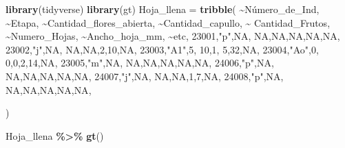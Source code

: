 \documentclass[
]{book}
\newenvironment{Shaded}{\begin{snugshade}}{\end{snugshade}}
\newcommand{\ConstantTok}[1]{\textcolor[rgb]{0.56,0.35,0.01}{#1}}
\newcommand{\DecValTok}[1]{\textcolor[rgb]{0.00,0.00,0.81}{#1}}
\newcommand{\FunctionTok}[1]{\textcolor[rgb]{0.13,0.29,0.53}{\textbf{#1}}}
\newcommand{\NormalTok}[1]{#1}
\newcommand{\OtherTok}[1]{\textcolor[rgb]{0.56,0.35,0.01}{#1}}
\newcommand{\SpecialCharTok}[1]{\textcolor[rgb]{0.81,0.36,0.00}{\textbf{#1}}}
\newcommand{\StringTok}[1]{\textcolor[rgb]{0.31,0.60,0.02}{#1}}
\theoremstyle{definition}
\theoremstyle{definition}
\theoremstyle{definition}
\theoremstyle{definition}
\theoremstyle{remark}
\begin{document}
\begin{Shaded}
\begin{Highlighting}[]
\FunctionTok{library}\NormalTok{(tidyverse)}
\FunctionTok{library}\NormalTok{(gt)}
\NormalTok{Hoja\_llena }\OtherTok{=} \FunctionTok{tribble}\NormalTok{(}
  \SpecialCharTok{\textasciitilde{}}\NormalTok{Número\_de\_Ind, }\SpecialCharTok{\textasciitilde{}}\NormalTok{Etapa, }\SpecialCharTok{\textasciitilde{}}\NormalTok{Cantidad\_flores\_abierta, }\SpecialCharTok{\textasciitilde{}}\NormalTok{Cantidad\_capullo, }\SpecialCharTok{\textasciitilde{}}\NormalTok{ Cantidad\_Frutos, }\SpecialCharTok{\textasciitilde{}}\NormalTok{Numero\_Hojas, }\SpecialCharTok{\textasciitilde{}}\NormalTok{Ancho\_hoja\_mm, }\SpecialCharTok{\textasciitilde{}}\NormalTok{etc,}
  \DecValTok{23001}\NormalTok{,}\StringTok{"p"}\NormalTok{,}\ConstantTok{NA}\NormalTok{, }\ConstantTok{NA}\NormalTok{,}\ConstantTok{NA}\NormalTok{,}\ConstantTok{NA}\NormalTok{,}\ConstantTok{NA}\NormalTok{,}\ConstantTok{NA}\NormalTok{,}
  \DecValTok{23002}\NormalTok{,}\StringTok{"j"}\NormalTok{,}\ConstantTok{NA}\NormalTok{, }\ConstantTok{NA}\NormalTok{,}\ConstantTok{NA}\NormalTok{,}\DecValTok{2}\NormalTok{,}\DecValTok{10}\NormalTok{,}\ConstantTok{NA}\NormalTok{,}
  \DecValTok{23003}\NormalTok{,}\StringTok{"A1"}\NormalTok{,}\DecValTok{5}\NormalTok{, }\DecValTok{10}\NormalTok{,}\DecValTok{1}\NormalTok{, }\DecValTok{5}\NormalTok{,}\DecValTok{32}\NormalTok{,}\ConstantTok{NA}\NormalTok{,}
  \DecValTok{23004}\NormalTok{,}\StringTok{"Ao"}\NormalTok{,}\DecValTok{0}\NormalTok{, }\DecValTok{0}\NormalTok{,}\DecValTok{0}\NormalTok{,}\DecValTok{2}\NormalTok{,}\DecValTok{14}\NormalTok{,}\ConstantTok{NA}\NormalTok{,}
  \DecValTok{23005}\NormalTok{,}\StringTok{"m"}\NormalTok{,}\ConstantTok{NA}\NormalTok{, }\ConstantTok{NA}\NormalTok{,}\ConstantTok{NA}\NormalTok{,}\ConstantTok{NA}\NormalTok{,}\ConstantTok{NA}\NormalTok{,}\ConstantTok{NA}\NormalTok{,}
  \DecValTok{24006}\NormalTok{,}\StringTok{"p"}\NormalTok{,}\ConstantTok{NA}\NormalTok{, }\ConstantTok{NA}\NormalTok{,}\ConstantTok{NA}\NormalTok{,}\ConstantTok{NA}\NormalTok{,}\ConstantTok{NA}\NormalTok{,}\ConstantTok{NA}\NormalTok{,}
  \DecValTok{24007}\NormalTok{,}\StringTok{"j"}\NormalTok{,}\ConstantTok{NA}\NormalTok{, }\ConstantTok{NA}\NormalTok{,}\ConstantTok{NA}\NormalTok{,}\DecValTok{1}\NormalTok{,}\DecValTok{7}\NormalTok{,}\ConstantTok{NA}\NormalTok{,}
  \DecValTok{24008}\NormalTok{,}\StringTok{"p"}\NormalTok{,}\ConstantTok{NA}\NormalTok{, }\ConstantTok{NA}\NormalTok{,}\ConstantTok{NA}\NormalTok{,}\ConstantTok{NA}\NormalTok{,}\ConstantTok{NA}\NormalTok{,}\ConstantTok{NA}\NormalTok{,}
  
\NormalTok{)}

\NormalTok{Hoja\_llena }\SpecialCharTok{\%\textgreater{}\%} \FunctionTok{gt}\NormalTok{()}
\end{Highlighting}
\end{Shaded}
\end{document}
